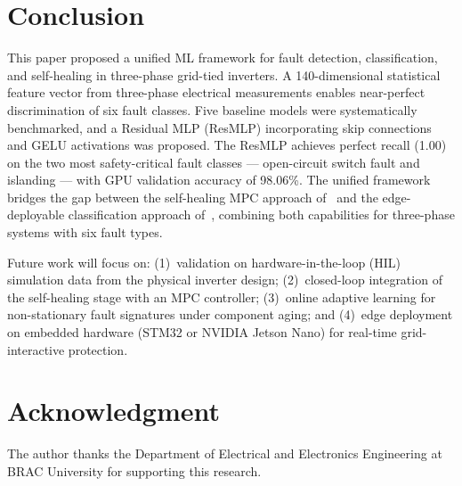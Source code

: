 \documentclass[conference]{IEEEtran}
\begin{document}
\section{Conclusion}

This paper proposed a unified ML framework for fault detection, classification,
and self-healing in three-phase grid-tied inverters. A 140-dimensional
statistical feature vector from three-phase electrical measurements enables
near-perfect discrimination of six fault classes. Five baseline models were
systematically benchmarked, and a Residual MLP (ResMLP) incorporating skip
connections and GELU activations was proposed. The ResMLP achieves perfect
recall (1.00) on the two most safety-critical fault classes --- open-circuit
switch fault and islanding --- with GPU validation accuracy of 98.06\%. The
unified framework bridges the gap between the self-healing MPC approach
of~\cite{baker2021} and the edge-deployable classification approach
of~\cite{prabakaran2026}, combining both capabilities for three-phase systems
with six fault types.

Future work will focus on: (1)~validation on hardware-in-the-loop (HIL)
simulation data from the physical inverter design; (2)~closed-loop integration
of the self-healing stage with an MPC controller; (3)~online adaptive learning
for non-stationary fault signatures under component aging; and (4)~edge
deployment on embedded hardware (STM32 or NVIDIA Jetson Nano) for real-time
grid-interactive protection.

\section*{Acknowledgment}

The author thanks the Department of Electrical and Electronics Engineering at
BRAC University for supporting this research.
\end{document}
